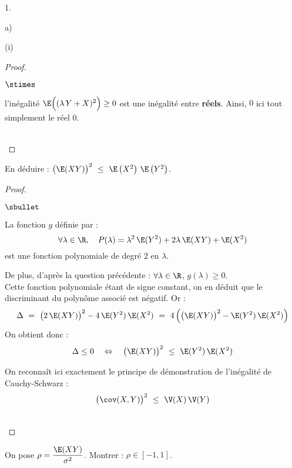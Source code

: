 \documentclass[11pt]{article}%
\begin{document}
\begin{noliste}{1.}
\begin{noliste}{a)}
\begin{nonoliste}{(i)}
\begin{proof}
\begin{remark}
\begin{noliste}{$\stimes$}
          \item l'inégalité $\E\Big( (\lambda \, Y +X)^2 \Big) \geq 0$
            est une inégalité entre {\bf réels}. Ainsi, \og $0$ \fg{}
            ici tout simplement le réel $0$.
          \end{noliste}
        \end{remark}~\\[-1.4cm]
      \end{proof}
      
    \item En déduire : $\big( \E(XY) \big)^2 \ \leq \ \E\left( X^2
      \right) \, \E\left( Y^2 \right)$.

      \begin{proof}~
        \begin{noliste}{$\sbullet$}
        \item La fonction $g$ définie par : 
          \[
            \forall \lambda \in \R, \quad P(\lambda) = \lambda^2 \,
            \E(Y^2) + 2 \lambda \, \E(XY) + \E(X^2)
          \]
          est une fonction polynomiale de degré $2$ en $\lambda$.

          
          \newpage

          
        \item De plus, d'après la question précédente : $\forall
          \lambda \in \R$, $g(\lambda) \geq 0$.\\
          Cette fonction polynomiale étant de signe constant, on en
          déduit que le  discriminant du polynôme associé est négatif.
          Or :
          \[
             \Delta \ = \ \big(2 \, \E(XY)\big)^2 - 4 \, \E(Y^2) \,
             \E(X^2) \ = \ 4 \, \Big(\big(\E(XY)\big)^2 - \E(Y^2) \, \E(X^2)\Big)
          \]
          On obtient donc :
          \[
            \Delta \leq 0 \quad \Leftrightarrow \quad
            \big(\E(XY)\big)^2 \ \leq \  \E(Y^2) \, \E(X^2)
          \]
        \end{noliste}
        \begin{remarkL}{.8}
          On reconnaît ici exactement le principe de démonstration de l'inégalité
          de Cauchy-Schwarz :
          \[
            \big(\cov(X,Y)\big)^2 \ \leq \ \V(X) \, \V(Y)
          \]
        \end{remarkL}~\\[-1.4cm]
      \end{proof}
      
    \item On pose $\rho = \dfrac{\E(XY)}{\sigma^2}$. Montrer : $\rho
      \in [-1,1]$.
    \end{nonoliste}


\end{noliste}
\end{noliste}
\end{document}
